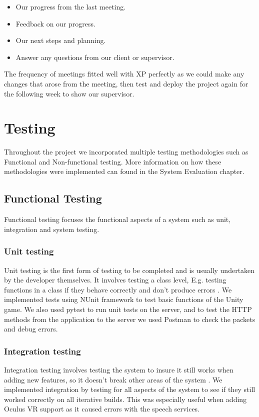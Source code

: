 \begin{itemize}
  \item Our progress from the last meeting.
  \item Feedback on our progress.
  \item Our next steps and planning.
  \item Answer any questions from our client or supervisor. 
\end{itemize}

The frequency of meetings fitted well with XP perfectly as we could make any changes that arose from the meeting, then test and deploy the project again for the following week to show our supervisor.

\section{Testing}
Throughout the project we incorporated multiple testing methodologies such as Functional and Non-functional testing. More information on how these methodologies were implemented can found in the System Evaluation chapter.

\subsection{Functional Testing}
Functional testing focuses the functional aspects of a system such as unit, integration and system testing.

\subsubsection{Unit testing}
Unit testing is the first form of testing to be completed and is usually undertaken by the developer themselves. It involves testing a class level, E.g. testing functions in a class if they behave correctly and don't produce errors \cite{5380492}. We implemented tests using NUnit framework to test basic functions of the Unity game. We also used pytest to run unit tests on the server, and to test the HTTP methods from the application to the server we used Postman to check the packets and debug errors.

\subsubsection{Integration testing}
Integration testing involves testing the system to insure it still works when adding new features, so it doesn't break other areas of the system \cite{5380492}. We implemented integration by testing for all aspects of the system to see if they still worked correctly on all iterative builds. This was especially useful when adding Oculus VR support as it caused errors with the speech services.

